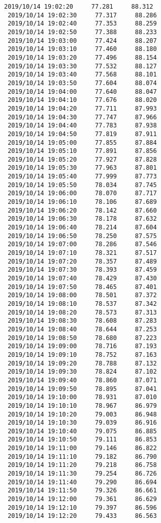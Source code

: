 \documentclass[11pt]{article}
\begin{document}
\begin{Verbatim}[commandchars=\\\{\}]
 2019/10/14 19:02:20     77.281     88.312
 2019/10/14 19:02:30     77.317     88.286
 2019/10/14 19:02:40     77.353     88.259
 2019/10/14 19:02:50     77.388     88.233
 2019/10/14 19:03:00     77.424     88.207
 2019/10/14 19:03:10     77.460     88.180
 2019/10/14 19:03:20     77.496     88.154
 2019/10/14 19:03:30     77.532     88.127
 2019/10/14 19:03:40     77.568     88.101
 2019/10/14 19:03:50     77.604     88.074
 2019/10/14 19:04:00     77.640     88.047
 2019/10/14 19:04:10     77.676     88.020
 2019/10/14 19:04:20     77.711     87.993
 2019/10/14 19:04:30     77.747     87.966
 2019/10/14 19:04:40     77.783     87.938
 2019/10/14 19:04:50     77.819     87.911
 2019/10/14 19:05:00     77.855     87.884
 2019/10/14 19:05:10     77.891     87.856
 2019/10/14 19:05:20     77.927     87.828
 2019/10/14 19:05:30     77.963     87.801
 2019/10/14 19:05:40     77.999     87.773
 2019/10/14 19:05:50     78.034     87.745
 2019/10/14 19:06:00     78.070     87.717
 2019/10/14 19:06:10     78.106     87.689
 2019/10/14 19:06:20     78.142     87.660
 2019/10/14 19:06:30     78.178     87.632
 2019/10/14 19:06:40     78.214     87.604
 2019/10/14 19:06:50     78.250     87.575
 2019/10/14 19:07:00     78.286     87.546
 2019/10/14 19:07:10     78.321     87.517
 2019/10/14 19:07:20     78.357     87.489
 2019/10/14 19:07:30     78.393     87.459
 2019/10/14 19:07:40     78.429     87.430
 2019/10/14 19:07:50     78.465     87.401
 2019/10/14 19:08:00     78.501     87.372
 2019/10/14 19:08:10     78.537     87.342
 2019/10/14 19:08:20     78.573     87.313
 2019/10/14 19:08:30     78.608     87.283
 2019/10/14 19:08:40     78.644     87.253
 2019/10/14 19:08:50     78.680     87.223
 2019/10/14 19:09:00     78.716     87.193
 2019/10/14 19:09:10     78.752     87.163
 2019/10/14 19:09:20     78.788     87.132
 2019/10/14 19:09:30     78.824     87.102
 2019/10/14 19:09:40     78.860     87.071
 2019/10/14 19:09:50     78.895     87.041
 2019/10/14 19:10:00     78.931     87.010
 2019/10/14 19:10:10     78.967     86.979
 2019/10/14 19:10:20     79.003     86.948
 2019/10/14 19:10:30     79.039     86.916
 2019/10/14 19:10:40     79.075     86.885
 2019/10/14 19:10:50     79.111     86.853
 2019/10/14 19:11:00     79.146     86.822
 2019/10/14 19:11:10     79.182     86.790
 2019/10/14 19:11:20     79.218     86.758
 2019/10/14 19:11:30     79.254     86.726
 2019/10/14 19:11:40     79.290     86.694
 2019/10/14 19:11:50     79.326     86.661
 2019/10/14 19:12:00     79.361     86.629
 2019/10/14 19:12:10     79.397     86.596
 2019/10/14 19:12:20     79.433     86.563

\end{Verbatim}
\end{document}
